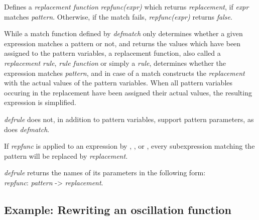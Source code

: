 \documentclass[../Maxima_Workbook.tex]{subfiles}
\begin{document}
\lzz {} \hfill \tcr{[function]}

\lz Defines a \emph{replacement function} \emph{repfunc(expr)} which returns \emph{replacement}, if \emph{expr} matches \emph{pattern}. Otherwise, if the match fails, \emph{repfunc(expr)} returns \emph{false}.

\lz While a match function defined by \emph{defmatch} only determines whether a given expression matches a pattern or not, and returns the values which have been assigned to the pattern variables, a replacement function, also called a \emph{replacement rule}, \emph{rule function} or simply a \emph{rule}, determines whether the expression matches \emph{pattern}, and in case of a match constructs the \emph{replacement} with the actual values of the pattern variables. When all pattern variables occuring in the replacement have been assigned their actual values, the resulting expression is simplified.

\lz \emph{defrule} does not, in addition to pattern variables, support pattern parameters, as does \emph{defmatch}. 

\lz If \emph{repfunc} is applied to an expression by , , or , every subexpression matching the pattern will be replaced by \emph{replacement}. 

\lz \emph{defrule} returns the names of its parameters in the following form: \\ \emph{repfunc}: \emph{pattern} -> \emph{replacement}.

\subsection{Example: Rewriting an oscillation function}\label{RP2}
\end{document}
